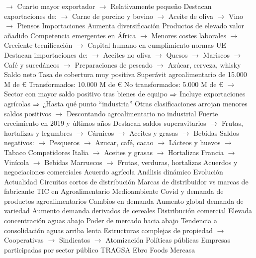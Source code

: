 \documentclass{nuevotema}
\begin{document}
\begin{esquemal}
				\4[] $\to$ Cuarto mayor exportador
				\4[] $\to$ Relativamente pequeño
				\4[] Destacan exportaciones de:
				\4[] $\to$ Carne de porcino y bovino
				\4[] $\to$ Aceite de oliva
				\4[] $\to$ Vino
				\4[] $\to$ Piensos
				\4 Importaciones
				\4[] Aumenta diversificación
				\4[] Productos de elevado valor añadido
				\4[] Competencia emergentes en África
				\4[] $\to$ Menores costes laborales
				\4[] $\to$ Creciente tecnificación
				\4[] $\to$ Capital humano en cumplimiento normas UE
				\4[] Destacan importaciones de:
				\4[] $\to$ Aceites no oliva
				\4[] $\to$ Quesos
				\4[] $\to$ Mariscos
				\4[] $\to$ Café y sucedáneos
				\4[] $\to$ Preparaciones de pescado
				\4[] $\to$ Azúcar, cerveza, whisky
				\4 Saldo neto
				\4[] Tasa de cobertura muy positiva
				\4[] Superávit agroalimentario de 15.000 M de €
				\4[] Transformados: 10.000 M de €
				\4[] No transformados: 5.000 M de €
				\4[] $\to$ Sector con mayor saldo positivo tras bienes de equipo
				\4[] $\Rightarrow$ Incluye exportaciones agrícolas
				\4[] $\Rightarrow$ ¿Hasta qué punto ``industria''
				\4[] Otras clasificaciones arrojan menores saldos positivos
				\4[] $\to$ Descontando agroalimentario no industrial
				\4[] Fuerte crecimiento en 2019 y últimos años
				\4[] Destacan saldos superavitarios
				\4[] $\to$ Frutas, hortalizas y legumbres
				\4[] $\to$ Cárnicos
				\4[] $\to$ Aceites y grasas
				\4[] $\to$ Bebidas
				\4[] Saldos negativos:
				\4[] $\to$ Pesqueros
				\4[] $\to$ Azucar, café, cacao
				\4[] $\to$ Lácteos y huevos
				\4[] $\to$ Tabaco
				\4 Competidores
				\4[] Italia
				\4[] $\to$ Aceites y grasas
				\4[] $\to$ Hortalizas
				\4[] Francia
				\4[] $\to$ Vinícola
				\4[] $\to$ Bebidas
				\4[] Marruecos
				\4[] $\to$ Frutas, verduras, hortalizas
				\4 Acuerdos y negociaciones comerciales
				\4[] Acuerdo agrícola
		\2 Análisis dinámico
			\3 Evolución
			\3 Actualidad
			\3 Circuitos cortos de distribución
			\3 Marcas de distribuidor vs marcas de fabricante
			\3 TIC en Agroalimentario
			\3 Medioambiente
			\3 Covid y demanda de productos agroalimentarios
			\3 Cambios en demanda
				\4 Aumento global demanda de variedad
				\4 Aumento demanda derivados de cereales
			\3 Distribución comercial
				\4 Elevada concentración aguas abajo
				\4 Poder de mercado hacia abajo
				\4 Tendencia a consolidación aguas arriba lenta
				\4[] Estructuras complejas de propiedad
				\4[] $\to$ Cooperativas
				\4[] $\to$ Sindicatos
				\4[] $\to$ Atomización
		\2 Políticas públicas
			\3 Empresas participadas por sector público
				\4 TRAGSA
				\4 Ebro Foods
				\4 Mercasa

\end{esquemal}
\end{document}
